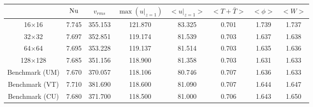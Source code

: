 \begin{tabular}{c|ccccccc}
    & $\mathrm{Nu}$ & $v_{rms}$ & $\max(u|_{z=1})$ & $<u|_{z=1}>$ & $<T + \bar{T}>$ & $<\phi>$ & $<W>$ \\
\hline
16$\times$16 & 7.745 & 355.153 & 121.870 & 83.325 & 0.701 & 1.739 & 1.737 \\
32$\times$32 & 7.697 & 352.851 & 119.174 & 81.539 & 0.703 & 1.637 & 1.638 \\
64$\times$64 & 7.695 & 353.228 & 119.137 & 81.514 & 0.703 & 1.635 & 1.636 \\
128$\times$128 & 7.685 & 351.156 & 118.900 & 81.358 & 0.703 & 1.631 & 1.633 \\
\hline
Benchmark (UM) & 7.670 & 370.057 & 118.106 & 80.746 & 0.707 & 1.636 & 1.633 \\
Benchmark (VT) & 7.710 & 381.690 & 118.600 & 81.090 & 0.707 & 1.644 & 1.647 \\
Benchmark (CU) & 7.680 & 371.700 & 118.500 & 81.000 & 0.706 & 1.643 & 1.650 \\
\end{tabular}
